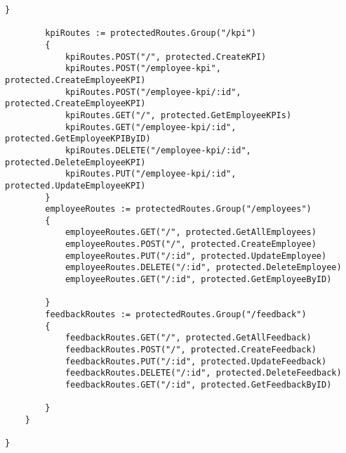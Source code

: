 \begin{lstlisting}[language=Golang, caption=Routes, frame=single]
        }

        kpiRoutes := protectedRoutes.Group("/kpi")
        {
            kpiRoutes.POST("/", protected.CreateKPI)
            kpiRoutes.POST("/employee-kpi", protected.CreateEmployeeKPI)
            kpiRoutes.POST("/employee-kpi/:id", protected.CreateEmployeeKPI)
            kpiRoutes.GET("/", protected.GetEmployeeKPIs)
            kpiRoutes.GET("/employee-kpi/:id", protected.GetEmployeeKPIByID)
            kpiRoutes.DELETE("/employee-kpi/:id", protected.DeleteEmployeeKPI)
            kpiRoutes.PUT("/employee-kpi/:id", protected.UpdateEmployeeKPI)
        }
        employeeRoutes := protectedRoutes.Group("/employees")
        {
            employeeRoutes.GET("/", protected.GetAllEmployees)
            employeeRoutes.POST("/", protected.CreateEmployee)
            employeeRoutes.PUT("/:id", protected.UpdateEmployee)
            employeeRoutes.DELETE("/:id", protected.DeleteEmployee)
            employeeRoutes.GET("/:id", protected.GetEmployeeByID)
            
        }
        feedbackRoutes := protectedRoutes.Group("/feedback")
        {
            feedbackRoutes.GET("/", protected.GetAllFeedback)
            feedbackRoutes.POST("/", protected.CreateFeedback)
            feedbackRoutes.PUT("/:id", protected.UpdateFeedback)
            feedbackRoutes.DELETE("/:id", protected.DeleteFeedback)
            feedbackRoutes.GET("/:id", protected.GetFeedbackByID)
            
        }
    }

}
\end{lstlisting}

